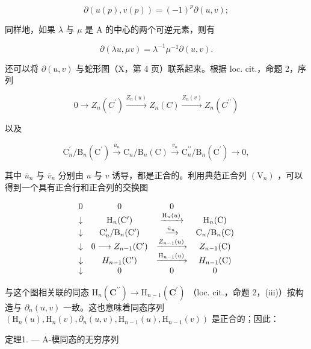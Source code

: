 \[
\partial (u (p), v (p)) = (- 1) ^ {p} \partial (u, v);\tag{4}
\]

同样地，如果 \(\lambda\) 与 \(\mu\) 是 A 的中心的两个可逆元素，则有

\[
\partial (\lambda u, \mu v) = \lambda^ {- 1} \mu^ {- 1} \partial (u, v).\tag{5}
\]

还可以将 \(\partial(u,v)\) 与蛇形图（X，第 4 页）联系起来。根据 loc. cit.，命题 2，序列

\[
0 \longrightarrow Z _ {n} (C ^ {\prime}) \xrightarrow {Z _ {n} (u)} Z _ {n} (C) \xrightarrow {Z _ {n} (v)} Z _ {n} (C ^ {\prime \prime})
\]

以及

\[
\mathrm{C} _ {n} ^ {\prime} / \mathrm{B} _ {n} (\mathrm{C} ^ {\prime}) \xrightarrow {\overline {{{u}}} _ {n}} \mathrm{C} _ {n} / \mathrm{B} _ {n} (\mathrm{C}) \xrightarrow {\overline {{{v}}} _ {n}} \mathrm{C} _ {n} ^ {\prime \prime} / \mathrm{B} _ {n} (\mathrm{C} ^ {\prime}) \longrightarrow 0,
\]

其中 \(\overline{u}_{n}\) 与 \(\overline{v}_{n}\) 分别由 \(u\) 与 \(v\) 诱导，都是正合的。利用典范正合列 \((\mathrm{V}_{n})\) ，可以得到一个具有正合行和正合列的交换图

\[
\begin{array}{c c c c} 0 & 0 & 0 \\ \downarrow & \mathrm{H} _ {n} (\mathrm{C} ^ {\prime}) & \xrightarrow {\mathrm{H} _ {n} (u)} & \mathrm{H} _ {n} (\mathrm{C}) \\ \downarrow & \mathrm{C} _ {n} ^ {\prime} / \mathrm{B} _ {n} (\mathrm{C} ^ {\prime}) & \xrightarrow {\bar {u} _ {n}} & \mathrm{C} _ {n} / \mathrm{B} _ {n} (\mathrm{C}) \\ \downarrow & 0 \longrightarrow Z _ {n - 1} (\mathrm{C} ^ {\prime}) & \xrightarrow {Z _ {n - 1} (u)} & Z _ {n - 1} (\mathrm{C}) \\ \downarrow & H _ {n - 1} (\mathrm{C} ^ {\prime}) & \xrightarrow {\mathrm{H} _ {n - 1} (u)} & H _ {n - 1} (\mathrm{C}) \\ \downarrow & 0 & 0 & 0 \end{array}
\]

与这个图相关联的同态 \(\mathrm{H}_{n}(\mathbf{C}^{\prime \prime})\to \mathrm{H}_{n - 1}(\mathbf{C}^{\prime})\) （loc. cit.，命题 2，(iii)）按构造与 \(\partial_n(u,v)\) 一致。这也意味着同态序列 \((\mathrm{H}_n(u),\mathrm{H}_n(v),\partial_n(u,v),\mathrm{H}_{n - 1}(u),\mathrm{H}_{n - 1}(v))\) 是正合的；因此：

定理1. --- A-模同态的无穷序列

